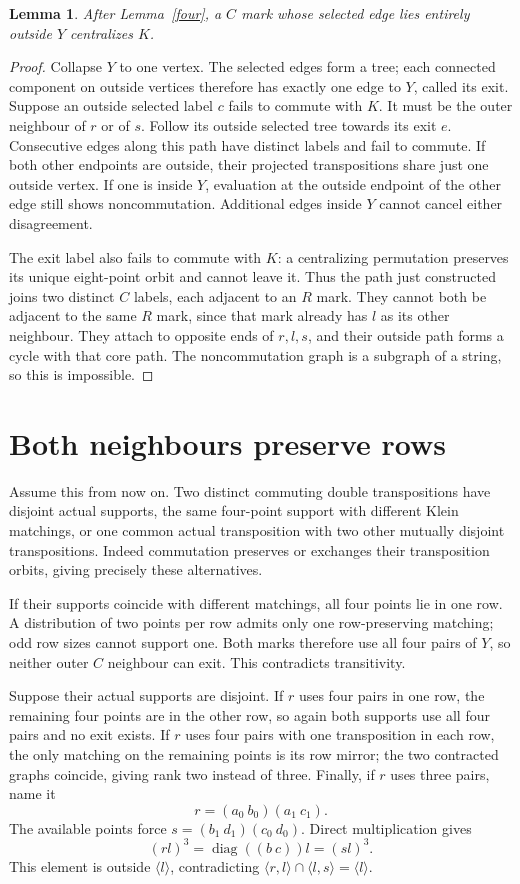 \documentclass[11pt,a4paper]{article}
\newtheorem{lemma}{Lemma}
\newcommand{\gen}[1]{\langle#1\rangle}
\newcommand{\diag}{\operatorname{diag}}
\begin{document}
\begin{lemma}\label{tails}
After Lemma~\ref{four}, a $C$ mark whose selected edge lies
entirely outside $Y$ centralizes $K$.
\end{lemma}
\begin{proof}
Collapse $Y$ to one vertex. The selected edges form a tree;
each connected component on outside vertices therefore has
exactly one edge to $Y$, called its exit. Suppose an outside
selected label $c$ fails to commute with $K$. It must be the
outer neighbour of $r$ or of $s$. Follow its outside selected
tree towards its exit $e$. Consecutive edges along this path
have distinct labels and fail to commute. If both other endpoints
are outside, their projected transpositions share just one
outside vertex. If one is inside $Y$, evaluation at the outside
endpoint of the other edge still shows noncommutation. Additional
edges inside $Y$ cannot cancel either disagreement.

The exit label also fails to commute with $K$: a centralizing
permutation preserves its unique eight-point orbit and cannot
leave it. Thus the path just constructed joins two distinct
$C$ labels, each adjacent to an $R$ mark. They cannot both be
adjacent to the same $R$ mark, since that mark already has $l$
as its other neighbour. They attach to opposite ends of $r,l,s$,
and their outside path forms a cycle with that core path. The
noncommutation graph is a subgraph of a string, so this is
impossible.
\end{proof}

\section*{Both neighbours preserve rows}
Assume this from now on. Two distinct commuting double
transpositions have disjoint actual supports, the same four-point
support with different Klein matchings, or one common actual
transposition with two other mutually disjoint transpositions.
Indeed commutation preserves or exchanges their transposition
orbits, giving precisely these alternatives.

If their supports coincide with different matchings, all four
points lie in one row. A distribution of two points per row
admits only one row-preserving matching; odd row sizes cannot
support one. Both marks therefore use all four pairs of $Y$,
so neither outer $C$ neighbour can exit. This contradicts
transitivity.

Suppose their actual supports are disjoint. If $r$ uses four
pairs in one row, the remaining four points are in the other
row, so again both supports use all four pairs and no exit
exists. If $r$ uses four pairs with one transposition in each
row, the only matching on the remaining points is its row
mirror; the two contracted graphs coincide, giving rank two
instead of three. Finally, if $r$ uses three pairs, name it
\[
                 r=(a_0\ b_0)(a_1\ c_1).
\]
The available points force $s=(b_1\ d_1)(c_0\ d_0)$. Direct
multiplication gives
\[
                  (rl)^3=\diag((b\ c))l=(sl)^3.
\]
This element is outside $\gen l$, contradicting
$\gen{r,l}\cap\gen{l,s}=\gen l$.
\end{document}
